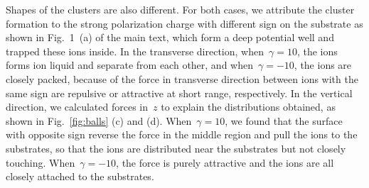 Shapes of the clusters are also different.
For both cases, we attribute the cluster formation to the strong polarization charge with different sign on the substrate as shown in Fig.~1~(a) of the main text, which form a deep potential well and trapped these ions inside.
In the transverse direction, when~$\gamma = 10$, the ions forms ion liquid and separate from each other, and when~$\gamma = -10$, the ions are closely packed, because of the force in transverse direction between ions with the same sign are repulsive or attractive at short range, respectively.
In the vertical direction, we calculated forces in~$z$ to explain the distributions obtained, as shown in Fig.~\ref{fig:balls} (c) and (d).
When~$\gamma = 10$, we found that the surface with opposite sign reverse the force in the middle region and pull the ions to the substrates, so that the ions are distributed near the substrates but not closely touching.
When~$\gamma = -10$, the force is purely attractive and the ions are all closely attached to the substrates.
